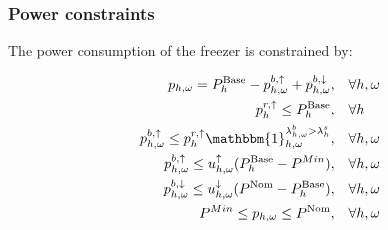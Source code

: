 {\subsubsection{Power constraints}\label{sec:power_constraints}

The power consumption of the freezer is constrained by:

\begin{subequations}\label{eq:power_constraints}
    \begin{align}
        p_{h,\omega} = P^{\text{Base}}_{h} - p^{b, \uparrow}_{h,\omega} + p^{b, \downarrow}_{h,\omega}, \quad                                                                                          & \forall{h,\omega}                                                                             \label{con_power:subeq1}  \\
        p^{r, \uparrow}_h \leq P^{\text{Base}}_h, \quad                                                                                                                                                & \forall{h}                                                                                     \label{con_power:subeq2} \\
        p^{b, \uparrow}_{h,\omega} \leq p^{r, \uparrow}_h \mathbbm{1}_{h,\omega}^{\lambda^{b}_{h,\omega} > \lambda^{s}_{h}} , \quad                                                                    & \forall{h,\omega}                                                                             \label{con_power:subeq3}  \\
        p^{b, \uparrow}_{h,\omega} \leq u_{h,\omega}^{\uparrow} (P^{\text{Base}}_{h} - P^{Min}) , \quad                                                                                                & \forall{h,\omega}                                                                             \label{con_power:subeq4}  \\
        p^{b, \downarrow}_{h,\omega} \leq u^{\downarrow}_{h,\omega} (P^{\text{Nom}} -P^{\text{Base}}_{h}), \quad                                                                                       & \forall{h,\omega}                                                                             \label{con_power:subeq5}  \\
        P^{Min} \leq p_{h,\omega} \leq P^{\text{Nom}}, \quad                                                                                                                                           & \forall{h,\omega}                                                                             \label{con_power:subeq6}  \\

\end{align}
\end{subequations}}

